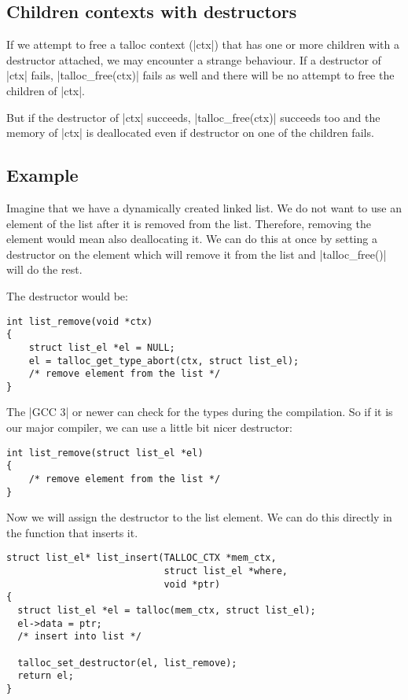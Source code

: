 \subsection{Children contexts with destructors}

If we attempt to free a talloc context (|ctx|) that has one or more children
with a destructor attached, we may encounter a strange behaviour. If a
destructor of |ctx| fails, |talloc_free(ctx)| fails as well and there will
be no attempt to free the children of |ctx|.

But if the destructor of |ctx| succeeds, |talloc_free(ctx)| succeeds too and
the memory of |ctx| is deallocated even if destructor on one of the children
fails.

\subsection{Example}

Imagine that we have a dynamically created linked list. We do not want to use an
element of the list after it is removed from the list. Therefore, removing the
element would mean also deallocating it. We can do this at once by setting a
destructor on the element which will remove it from the list and
|talloc_free()| will do the rest.

The destructor would be:

\begin{lstlisting}[caption={Remove an element from the list -- destructor}]
int list_remove(void *ctx)
{
    struct list_el *el = NULL;
    el = talloc_get_type_abort(ctx, struct list_el);
    /* remove element from the list */    
}
\end{lstlisting}

\noindent
The |GCC 3| or newer can check for the types during the compilation. So if it is
our major compiler, we can use a little bit nicer destructor:

\begin{lstlisting}[caption={Remove an element from the list -- type safe
destructor}]
int list_remove(struct list_el *el)
{
    /* remove element from the list */    
}
\end{lstlisting}

\noindent
Now we will assign the destructor to the list element. We can do this directly
in the function that inserts it.

\begin{lstlisting}[caption={Remove an element from the list when freed},
morekeywords={talloc_set_destructor}]
struct list_el* list_insert(TALLOC_CTX *mem_ctx,
                            struct list_el *where,
                            void *ptr)
{
  struct list_el *el = talloc(mem_ctx, struct list_el);
  el->data = ptr;
  /* insert into list */
  
  talloc_set_destructor(el, list_remove);
  return el;
}
\end{lstlisting}

